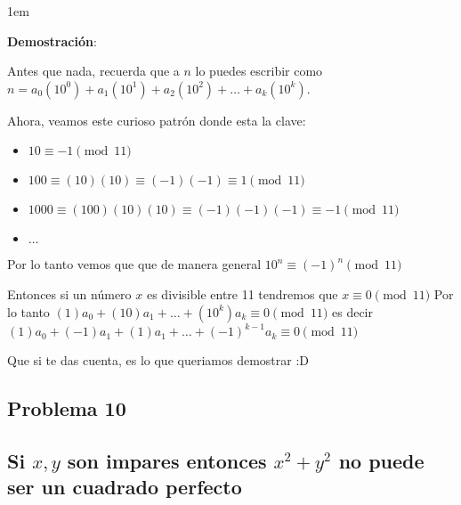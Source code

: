 \documentclass[12pt, fleqn]{article}                             %
\newenvironment{SmallIndentation}[1][0.75em]                    %
    {\begin{adjustwidth}{#1}{}\begin{footnotesize}}                 %
    {\end{footnotesize}\end{adjustwidth}}                           %
\begin{document}
        \begin{SmallIndentation}[1em]
            \textbf{Demostración}:

            Antes que nada, recuerda que a $n$ lo puedes escribir como
            $n = a_0(10^0) + a_1(10^1) + a_2(10^2) + \dots + a_k(10^k)$.

            Ahora, veamos este curioso patrón donde esta la clave:
            \begin{itemize}
                 \item $10 \equiv -1 \pmod{11}$
                 \item $100 \equiv (10)(10) \equiv (-1)(-1) \equiv 1 \pmod{11}$
                 \item $1000 \equiv (100)(10)(10) \equiv (-1)(-1)(-1) \equiv -1 \pmod{11}$
                 \item $\dots$
             \end{itemize} 

            Por lo tanto vemos que que de manera general $10^n \equiv (-1)^n \pmod{11}$

            Entonces si un número $x$ es divisible entre 11 tendremos que $x \equiv 0 \pmod{11}$
            Por lo tanto $(1)a_0 + (10)a_1 + \dots +(10^k)a_k \equiv 0 \pmod{11}$
            es decir $(1)a_0 + (-1)a_1 + (1)a_1 +\dots +(-1)^{k-1}a_k \equiv 0 \pmod{11}$

            Que si te das cuenta, es lo que queriamos demostrar :D

        \end{SmallIndentation}



        \subsection{Problema 10}
    \subsection*{Si $x, y$ son impares entonces $x^2 + y^2$ no puede ser un cuadrado
        perfecto}
\end{document}
